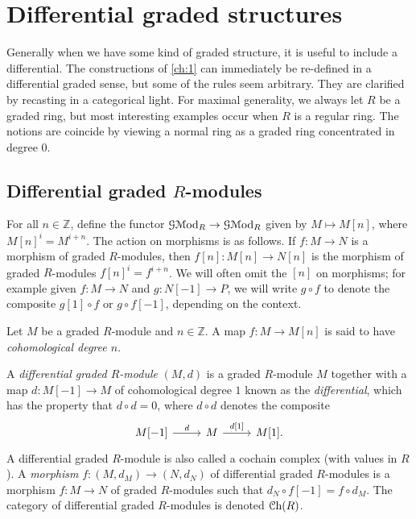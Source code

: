 \chapter{Differential graded structures}\label{ch:2}

Generally when we have some kind of graded structure, it is useful to include a differential. The constructions of \cref{ch:1} can immediately be re-defined in a differential graded sense, but some of the rules seem arbitrary. They are clarified by recasting in a categorical light. For maximal generality, we always let $R$ be a graded ring, but most interesting examples occur when $R$ is a regular ring. The notions are coincide by viewing a normal ring as a graded ring concentrated in degree 0.

\section{Differential graded $R$-modules}\label{sec:2.1}

\begin{definition}\label{2.1.1}
	For all $n\in\mathbb{Z} $, define the functor $\mathcal{G} \mathcal{M}\mathrm{od} _R\to \mathcal{G} \mathcal{M}\mathrm{od} _R$ given by $M\mapsto M[n]$, where $M[n]^i=M^{i+n} $. The action on morphisms is as follows. If $f : M \to N$ is a morphism of graded $R$-modules, then $f[n]: M[n] \to N[n]$ is the morphism of graded $R$-modules $f[n]^i=f^{i+n} $. We will often omit the $[n]$ on morphisms; for example given $f : M \to N$ and $g : N[-1] \to P$, we will write $g\circ f$ to denote the composite $g[1]\circ f$ or $g\circ f[-1]$, depending on the context.
\end{definition}

\begin{terminology}\label{2.1.2}
	Let $M$ be a graded $R$-module and $n\in\mathbb{Z} $. A map $f : M \to M[n]$ is said to have \emph{cohomological degree $n$}.
\end{terminology}

\begin{definition}\label{2.1.3}
	A \emph{differential graded $R$-module} $(M,d)$ is a graded $R$-module $M$ together with a map $d : M[-1] \to M$ of cohomological degree $1$ known as the \emph{differential}, which has the property that $d\circ d=0$, where $d\circ d$ denotes the composite
	\[\begin{tikzcd}[row sep = 2.5em, column sep = 2.5em]
		{M[-1]} & {M} & {M[1]}.
		\arrow[from=1-2, to=1-3, " {d[1]} ", ]
		\arrow[from=1-1, to=1-2, " d ", ]
	\end{tikzcd}\]
	A differential graded $R$-module is also called a cochain complex (with values in $R$). A \emph{morphism} $f : (M,d_M) \to (N,d_N)$ of differential graded $R$-modules is a morphism $f : M \to N$ of graded $R$-modules such that $d_N \circ f[-1] = f\circ d_M$. The category of differential graded $R$-modules is denoted $\mathcal{C}\mathrm{h}(R) $.
\end{definition}

